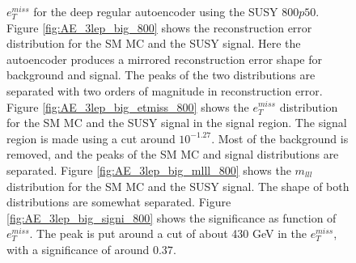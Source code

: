 \begin{figure}[h!]
{    $e_T^{miss}$ for the deep regular autoencoder using the SUSY $800p50$. 
    Figure \ref{fig:AE_3lep_big_800} shows the reconstruction error 
    distribution for the SM MC and the SUSY signal. Here the autoencoder produces a mirrored reconstruction error shape for background and 
    signal. The peaks of the two distributions are separated with two orders of magnitude in reconstruction error. Figure \ref{fig:AE_3lep_big_etmiss_800} 
    shows the $e_T^{miss}$ distribution for the SM MC and the SUSY signal in the signal region. 
    The signal region is made using a cut around $10^{-1.27}$. Most of the background is removed, and the peaks of the SM MC and signal 
    distributions are separated. Figure \ref{fig:AE_3lep_big_mlll_800} shows the $m_{lll}$ distribution for the SM MC and the SUSY signal. 
    The shape of both distributions are somewhat separated. Figure \ref{fig:AE_3lep_big_signi_800} shows the significance as function of
    $e_T^{miss}$. The peak is put around a cut of about 430 GeV in the $e_T^{miss}$, with a significance of around $0.37$.}
    \label{fig:AE_3lep_big_rec_sig_signi_800}
\end{figure}

